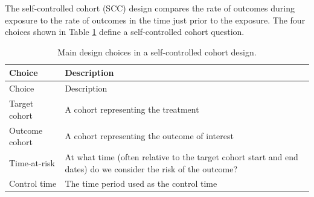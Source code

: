 \documentclass[11pt]{book}
\theoremstyle{definition}
\theoremstyle{definition}
\theoremstyle{definition}
\theoremstyle{remark}
\begin{document}
The self-controlled cohort (SCC) design \citep{ryan_2013} compares the rate of outcomes during exposure to the rate of outcomes in the time just prior to the exposure. The four choices shown in Table \ref{tab:sccChoices} define a self-controlled cohort question.  

\begin{longtable}[]{@{}ll@{}}
\caption{\label{tab:sccChoices} Main design choices in a self-controlled cohort design.}\tabularnewline
\toprule
\begin{minipage}[b]{0.23\columnwidth}\raggedright
Choice\strut
\end{minipage} & \begin{minipage}[b]{0.72\columnwidth}\raggedright
Description\strut
\end{minipage}\tabularnewline
\midrule
\endfirsthead
\toprule
\begin{minipage}[b]{0.23\columnwidth}\raggedright
Choice\strut
\end{minipage} & \begin{minipage}[b]{0.72\columnwidth}\raggedright
Description\strut
\end{minipage}\tabularnewline
\midrule
\endhead
\begin{minipage}[t]{0.23\columnwidth}\raggedright
Target cohort\strut
\end{minipage} & \begin{minipage}[t]{0.72\columnwidth}\raggedright
A cohort representing the treatment\strut
\end{minipage}\tabularnewline
\begin{minipage}[t]{0.23\columnwidth}\raggedright
Outcome cohort\strut
\end{minipage} & \begin{minipage}[t]{0.72\columnwidth}\raggedright
A cohort representing the outcome of interest\strut
\end{minipage}\tabularnewline
\begin{minipage}[t]{0.23\columnwidth}\raggedright
Time-at-risk\strut
\end{minipage} & \begin{minipage}[t]{0.72\columnwidth}\raggedright
At what time (often relative to the target cohort start and end dates) do we consider the risk of the outcome?\strut
\end{minipage}\tabularnewline
\begin{minipage}[t]{0.23\columnwidth}\raggedright
Control time\strut
\end{minipage} & \begin{minipage}[t]{0.72\columnwidth}\raggedright
The time period used as the control time\strut
\end{minipage}\tabularnewline
\bottomrule
\end{longtable}
\end{document}
